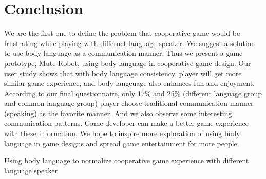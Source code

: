 \section{Conclusion}



We are the first one to define the problem that cooperative game would be frustrating while playing with differnet language speaker. We suggest a solution to use body language as a communication manner. Thus we present a game prototype, Mute Robot, using body language in cooperative game design. Our user study shows that with body language consistency, player will get more similar game experience, and body langeuage also enhances fun and enjoyment. According to our final questionnaire, only 17\% and 25\% (different language group and common language group) player choose traditional communication manner (speaking) as the favorite manner. And we also observe some interesting communication patterns. Game developer can make a better game experience with these information. We hope to inspire more exploration of using body language in game designs and spread game entertainment for more people.


Using body language to normalize cooperative game experience with different language speaker

